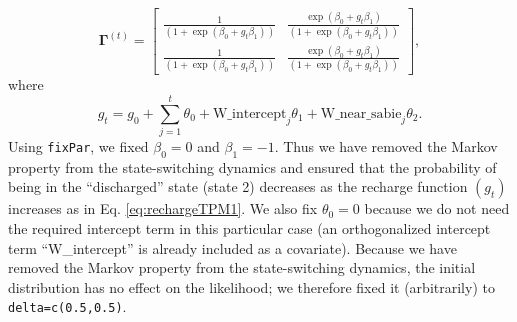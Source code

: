 \documentclass[12pt]{article}\usepackage[]{graphicx}\usepackage[]{xcolor}
\begin{document}
\begin{equation*}
  {\mathbf \Gamma^{(t)}} = \begin{bmatrix}
    \frac{1}{(1+\exp(\beta_0+g_t\beta_1))} & \frac{\exp(\beta_0+g_t\beta_1)}{(1+\exp(\beta_0+g_t\beta_1))}  \\
    \frac{1}{(1+\exp(\beta_0+g_t\beta_1))} & \frac{\exp(\beta_0+g_t\beta_1)}{(1+\exp(\beta_0+g_t\beta_1))}   
  \end{bmatrix},
\end{equation*}
where
\begin{equation*}
  g_t = g_0 + \sum_{j=1}^t \theta_0 + \text{W\_intercept}_j \theta_1 + \text{W\_near\_sabie}_j \theta_2.
\end{equation*}
Using \verb|fixPar|, we fixed $\beta_0=0$ and $\beta_1=-1$. Thus we have removed the Markov property from the state-switching dynamics and ensured that the probability of being in the ``discharged'' state (state 2) decreases as the recharge function $(g_t)$ increases as in Eq. \ref{eq:rechargeTPM1}. We also fix $\theta_0=0$ because we do not need the required intercept term in this particular case (an orthogonalized intercept term ``W\_intercept'' is already included as a covariate). Because we have removed the Markov property from the state-switching dynamics, the initial distribution has no effect on the likelihood; we therefore fixed it (arbitrarily) to \verb|delta=c(0.5,0.5)|.
\end{document}
